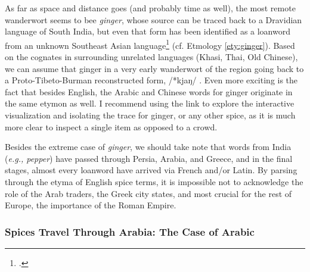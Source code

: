 As far as space and distance goes (and probably time as well), the most remote \gls{wanderwort} seems to bee \textit{ginger}, whose source can be traced back to a Dravidian language of South India, but even that form has been identified as a loanword from an unknown Southeast Asian language\footcite[ginger]{oed} (cf. Etmology \ref{ety:ginger}). Based on the cognates in surrounding unrelated languages (Khasi, Thai, Old Chinese), we can assume that ginger in a very early \gls{wanderwort} of the region going back to a Proto-Tibeto-Burman reconstructed form, /*kjaŋ/ \autocite[302]{matisoff_handbook_2003}. Even more exciting is the fact that besides English, the Arabic and Chinese words for ginger originate in the same etymon as well. I recommend using the link to explore the interactive visualization and isolating the trace for ginger, or any other spice, as it is much more clear to inspect a single item as opposed to a crowd.

Besides the extreme case of \textit{ginger}, we should take note that words from India (\textit{e.g., pepper}) have passed through Persia, Arabia, and Greece, and in the final stages, almost every loanword have arrived via French and/or Latin. By parsing through the etyma of English spice terms, it is impossible not to acknowledge the role of the Arab traders, the Greek city states, and most crucial for the rest of Europe, the importance of the Roman Empire.



\subsubsection{Spices Travel Through Arabia: The Case of Arabic}

